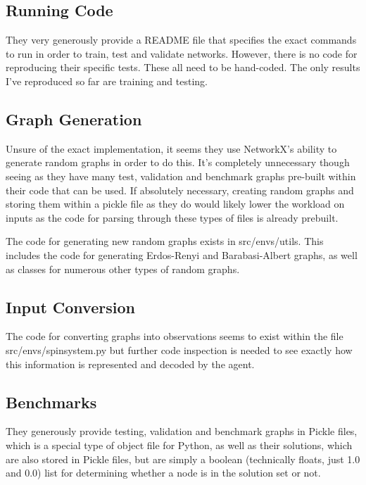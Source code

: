 \documentclass{article}
\begin{document}
\subsection{Running Code}

They very generously provide a README file that specifies the exact commands to run in order to train, test and validate networks. However, there is no code for reproducing their specific tests. These all need to be hand-coded. The only results I've reproduced so far are training and testing.

\subsection{Graph Generation}

Unsure of the exact implementation, it seems they use NetworkX's ability to generate random graphs in order to do this. It's completely unnecessary though seeing as they have many test, validation and benchmark graphs pre-built within their code that can be used. If absolutely necessary, creating random graphs and storing them within a pickle file as they do would likely lower the workload on inputs as the code for parsing through these types of files is already prebuilt.

The code for generating new random graphs exists in src/envs/utils. This includes the code for generating Erdos-Renyi and Barabasi-Albert graphs, as well as classes for numerous other types of random graphs.

\subsection{Input Conversion}

The code for converting graphs into observations seems to exist within the file src/envs/spinsystem.py but further code inspection is needed to see exactly how this information is represented and decoded by the agent.

\subsection{Benchmarks}

They generously provide testing, validation and benchmark graphs in Pickle files, which is a special type of object file for Python, as well as their solutions, which are also stored in Pickle files, but are simply a boolean (technically floats, just 1.0 and 0.0) list for determining whether a node is in the solution set or not.




\end{document}
